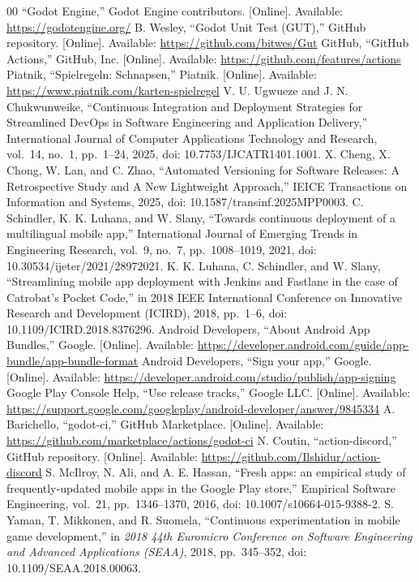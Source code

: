 \begin{thebibliography}{00}
    \sloppy
     ``Godot Engine,'' Godot Engine contributors. [Online]. Available: \url{https://godotengine.org/}
     B. Wesley, ``Godot Unit Test (GUT),'' GitHub repository. [Online]. Available: \url{https://github.com/bitwes/Gut}
     GitHub, ``GitHub Actions,'' GitHub, Inc. [Online]. Available: \url{https://github.com/features/actions}
     Piatnik, ``Spielregeln: Schnapsen,'' Piatnik. [Online]. Available: \url{https://www.piatnik.com/karten-spielregel}
     V. U. Ugwueze and J. N. Chukwunweike, ``Continuous Integration and Deployment Strategies for Streamlined DevOps in Software Engineering and Application Delivery,'' International Journal of Computer Applications Technology and Research, vol.~14, no.~1, pp.~1--24, 2025, doi: 10.7753/IJCATR1401.1001.
     X. Cheng, X. Chong, W. Lan, and C. Zhao, ``Automated Versioning for Software Releases: A Retrospective Study and A New Lightweight Approach,'' IEICE Transactions on Information and Systems, 2025, doi: 10.1587/transinf.2025MPP0003.
     C. Schindler, K. K. Luhana, and W. Slany, ``Towards continuous deployment of a multilingual mobile app,'' International Journal of Emerging Trends in Engineering Research, vol.~9, no.~7, pp.~1008--1019, 2021, doi: 10.30534/ijeter/2021/28972021.
     K. K. Luhana, C. Schindler, and W. Slany, ``Streamlining mobile app deployment with Jenkins and Fastlane in the case of Catrobat's Pocket Code,'' in 2018 IEEE International Conference on Innovative Research and Development (ICIRD), 2018, pp.~1--6, doi: 10.1109/ICIRD.2018.8376296.
     Android Developers, ``About Android App Bundles,'' Google. [Online]. Available: \url{https://developer.android.com/guide/app-bundle/app-bundle-format}
     Android Developers, ``Sign your app,'' Google. [Online]. Available: \url{https://developer.android.com/studio/publish/app-signing}
     Google Play Console Help, ``Use release tracks,'' Google LLC. [Online]. Available: \url{https://support.google.com/googleplay/android-developer/answer/9845334}
     A. Barichello, ``godot-ci,'' GitHub Marketplace. [Online]. Available: \url{https://github.com/marketplace/actions/godot-ci}
     N. Coutin, ``action-discord,'' GitHub repository. [Online]. Available: \url{https://github.com/Ilshidur/action-discord}
     S. McIlroy, N. Ali, and A. E. Hassan, ``Fresh apps: an empirical study of frequently-updated mobile apps in the Google Play store,'' Empirical Software Engineering, vol.~21, pp.~1346--1370, 2016, doi: 10.1007/s10664-015-9388-2.
     S. Yaman, T. Mikkonen, and R. Suomela, ``Continuous experimentation in mobile game development,'' in \textit{2018 44th Euromicro Conference on Software Engineering and Advanced Applications (SEAA)}, 2018, pp.~345--352, doi: 10.1109/SEAA.2018.00063.
\end{thebibliography}
